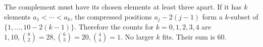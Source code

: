 The complement must have its chosen elements at least three apart. If it has $k$ elements $a_1<\cdots<a_k$, the compressed positions $a_j-2(j-1)$ form a $k$-subset of $\{1,\ldots,10-2(k-1)\}$. Therefore the counts for $k=0,1,2,3,4$ are $1,10,\binom 82=28,\binom 63=20,\binom 44=1$. No larger $k$ fits. Their sum is $\boxed{60}$.
